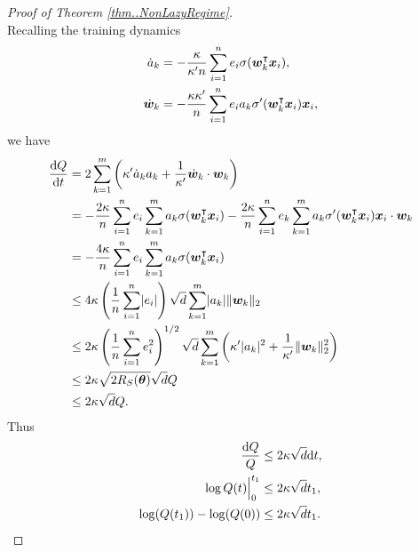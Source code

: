 \documentclass{article}
\begin{document}
\begin{proof}[Proof of Theorem \ref{thm..NonLazyRegime}]
\begin{equation}
    \end{equation}
    Recalling the training dynamics
    \begin{equation*}
        \begin{aligned}
            \dot{a}_k   & = -\frac{\kappa}{\kappa'n}\sum_{i=1}^n e_i\sigma(\bm{w}_k^\intercal\bm{x}_i), \\
            \dot{\bm{w}}_k & = -\frac{\kappa\kappa'}{n}\sum_{i=1}^n e_i a_k\sigma'(\bm{w}_k^\intercal\bm{x}_i)\bm{x}_i,
        \end{aligned}
    \end{equation*}
    we have
    \begin{equation*}
        \begin{aligned}
            \frac{\mathrm{d} Q}{\mathrm{d} t}
             & = 2\sum_{k=1}^m\left(\kappa'\dot{a}_k a_k + \frac{1}{\kappa'}\dot{\bm{w}}_k\cdot\bm{w}_k\right)                                                                    \\
             & = -\frac{2\kappa}{n}\sum_{i=1}^n e_i \sum_{k=1}^m a_k \sigma(\bm{w}_k^\intercal\bm{x}_i) - \frac{2\kappa}{n}\sum_{i=1}^n e_k\sum_{k=1}^m a_k\sigma'(\bm{w}_k^\intercal\bm{x}_i)\bm{x}_i\cdot\bm{w}_k \\
             & = -\frac{4\kappa}{n}\sum_{i=1}^n e_i\sum_{k=1}^m a_k\sigma(\bm{w}_k^\intercal\bm{x}_i)                                                                                        \\
             & \leq 4\kappa\left(\frac{1}{n}\sum_{i=1}^n\lvert e_i\rvert\right)\sqrt{d}\sum_{k=1}^m\lvert a_k\rvert\lVert\bm{w}_k\rVert_2                                                               \\
             & \leq 2\kappa\left(\frac{1}{n}\sum_{i=1}^n e_i^2\right)^{1/2}\sqrt{d}\sum_{k=1}^m\left(\kappa'\lvert a_k\rvert^2+\frac{1}{\kappa'}\lVert\bm{w}_k\rVert_2^2\right)                  \\
             & \leq 2\kappa\sqrt{2R_S(\bm{\theta})}\sqrt{d}Q                                                                                                                          \\
             & \leq 2\kappa\sqrt{d}Q.
        \end{aligned}
    \end{equation*}
    Thus
    \begin{align*}
        \frac{\mathrm{d} Q}{Q} &\leq 2\kappa\sqrt{d} \mathrm{d} t,\\
        \log Q(t)\Big|^{t_1}_0 &\leq 2\kappa\sqrt{d}t_1,\\
        \log(Q(t_1)) - \log(Q(0)) &\leq 2\kappa\sqrt{d}t_1.
    \end{align*}

\end{proof}
\end{document}
